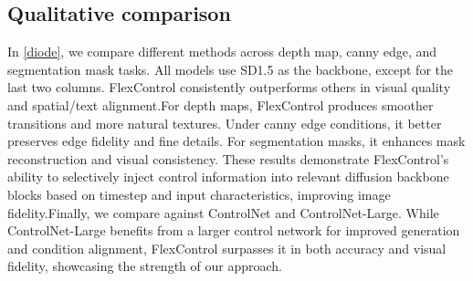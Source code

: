 \subsection{Qualitative comparison}

In \cref{diode}, we compare different methods across depth map, canny edge, and segmentation mask tasks. All models use SD1.5 as the backbone, except for the last two columns. FlexControl consistently outperforms others in visual quality and spatial/text alignment.For depth maps, FlexControl produces smoother transitions and more natural textures. Under canny edge conditions, it better preserves edge fidelity and fine details. For segmentation masks, it enhances mask reconstruction and visual consistency. These results demonstrate FlexControl’s ability to selectively inject control information into relevant diffusion backbone blocks based on timestep and input characteristics, improving image fidelity.Finally, we compare against ControlNet and ControlNet-Large. While ControlNet-Large benefits from a larger control network for improved generation and condition alignment, FlexControl surpasses it in both accuracy and visual fidelity, showcasing the strength of our approach.

